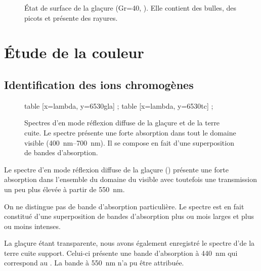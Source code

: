 \begin{figure}[htb]

  \caption{\legendeC 
           État de surface de la glaçure (Gr=\num{40}, ). Elle contient des 
           bulles, des picots et présente des rayures.}
  \label{surf:6530}
\end{figure}


\section{Étude de la couleur}

\subsection{Identification des ions chromogènes}
\begin{figure}[htb]
  \begin{plotspectre}
       table [x=lambda, y=6530gla] {\gladata} ;
       table [x=lambda, y=6530tc] {\tcdata} ;
  \end{plotspectre}
  \caption{\legendeC 
           Spectres d'\AO en mode réflexion diffuse de la glaçure et de la terre cuite. Le spectre présente une forte absorption dans tout le domaine visible (\SIrange{400}{700}{\nm}). Il se compose en fait d'une superposition de bandes d'absorption.}
  \label{spectre:6530}
\end{figure}

Le spectre d'\AO en mode réflexion diffuse de la glaçure () présente une forte absorption dans l'ensemble du domaine du visible avec toutefois une transmission un peu plus élevée à partir de \SI{550}{\nm}.

On ne distingue pas de bande d'absorption particulière. Le spectre est 
en fait constitué d'une superposition de bandes d'absorption plus ou 
mois larges et plus ou moins intenses.

La glaçure étant transparente, nous avons également enregistré le spectre d'\AO de la terre cuite support. Celui-ci présente une bande d'absorption à \SI{440}{\nm} qui correspond au  \autocite{Lajarte_1979}. La bande à \SI{550}{\nm} n'a pu être attribuée.

